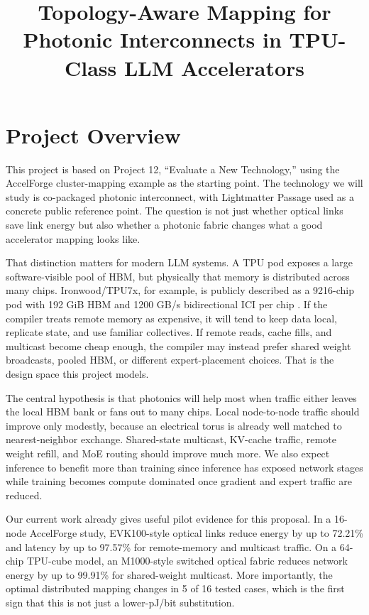 \documentclass[conference,onecolumn]{IEEEtran}
\newcommand{\pjbit}{pJ/bit}
\begin{document}
\title{Topology-Aware Mapping for Photonic Interconnects in TPU-Class LLM Accelerators}

\author{
\and
{}
}

\maketitle

\section{Project Overview}

This project is based on Project 12, ``Evaluate a New Technology,'' using the
AccelForge cluster-mapping example as the starting point. The technology we will
study is co-packaged photonic interconnect, with Lightmatter Passage used as a
concrete public reference point. The question is not just whether optical links
save link energy but also whether a photonic fabric
changes what a good accelerator mapping looks like.

That distinction matters for modern LLM systems. A TPU pod exposes a large
software-visible pool of HBM, but physically that memory is distributed across
many chips. Ironwood/TPU7x, for example, is publicly described as a 9216-chip
pod with 192 GiB HBM and 1200 GB/s bidirectional ICI per chip
\cite{tpu7x,ironwood-blog}. If the compiler treats remote memory as expensive,
it will tend to keep data local, replicate state, and use familiar collectives. If remote reads, cache fills, and multicast become cheap enough,
the compiler may instead prefer shared weight broadcasts, pooled HBM, or
different expert-placement choices. That is the design space this project
models.

The central hypothesis is that photonics will help most when traffic either
leaves the local HBM bank or fans out to many chips. Local node-to-node traffic
should improve only modestly, because an electrical torus is already well
matched to nearest-neighbor exchange. Shared-state multicast, KV-cache traffic,
remote weight refill, and MoE routing should improve much more. We also expect
inference to benefit more than training since inference has exposed network stages while training becomes compute dominated once gradient and expert traffic are
reduced.

Our current work already gives useful pilot evidence for this proposal. In
a 16-node AccelForge study, EVK100-style optical links reduce energy by up to
72.21\% and latency by up to 97.57\% for remote-memory and multicast traffic.
On a 64-chip TPU-cube model, an M1000-style switched optical fabric reduces
network energy by up to 99.91\% for shared-weight multicast. More importantly,
the optimal distributed mapping changes in 5 of 16 tested cases, which is the
first sign that this is not just a lower-\pjbit{} substitution.
\end{document}
